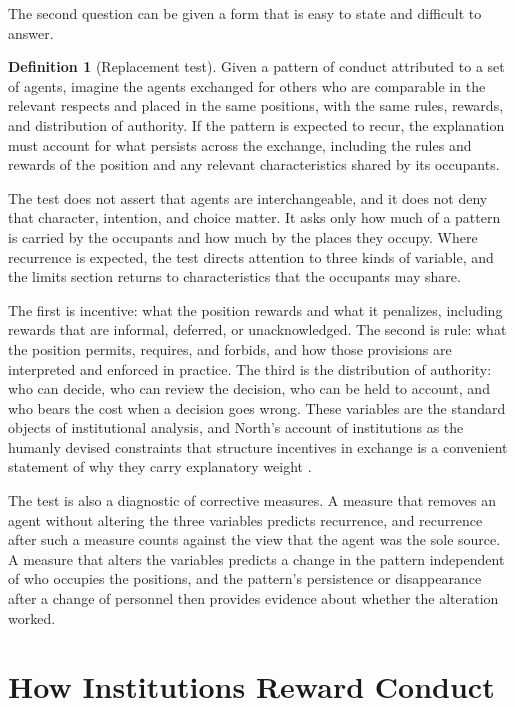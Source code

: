 \documentclass[11pt]{article}
\theoremstyle{definition}
\newtheorem{definition}{Definition}
\begin{document}
The second question can be given a form that is easy to state and difficult to answer.

\begin{definition}[Replacement test]
Given a pattern of conduct attributed to a set of agents, imagine the agents exchanged for others who are comparable in the relevant respects and placed in the same positions, with the same rules, rewards, and distribution of authority. If the pattern is expected to recur, the explanation must account for what persists across the exchange, including the rules and rewards of the position and any relevant characteristics shared by its occupants.
\end{definition}

The test does not assert that agents are interchangeable, and it does not deny that character, intention, and choice matter. It asks only how much of a pattern is carried by the occupants and how much by the places they occupy. Where recurrence is expected, the test directs attention to three kinds of variable, and the limits section returns to characteristics that the occupants may share.

The first is incentive: what the position rewards and what it penalizes, including rewards that are informal, deferred, or unacknowledged. The second is rule: what the position permits, requires, and forbids, and how those provisions are interpreted and enforced in practice. The third is the distribution of authority: who can decide, who can review the decision, who can be held to account, and who bears the cost when a decision goes wrong. These variables are the standard objects of institutional analysis, and North's account of institutions as the humanly devised constraints that structure incentives in exchange is a convenient statement of why they carry explanatory weight \cite{north1990}.

The test is also a diagnostic of corrective measures. A measure that removes an agent without altering the three variables predicts recurrence, and recurrence after such a measure counts against the view that the agent was the sole source. A measure that alters the variables predicts a change in the pattern independent of who occupies the positions, and the pattern's persistence or disappearance after a change of personnel then provides evidence about whether the alteration worked.

\section{How Institutions Reward Conduct}
\end{document}

